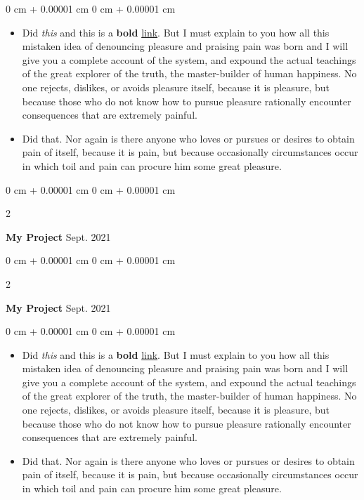 \documentclass[10pt, letterpaper]{article}
\newenvironment{highlights}{
    \begin{itemize}[
        topsep=0.10 cm,
        parsep=0.10 cm,
        partopsep=0pt,
        itemsep=0pt,
        leftmargin=0 cm + 10pt
    ]
}{
    \end{itemize}
} %
\newenvironment{onecolentry}{
    \begin{adjustwidth}{
        0 cm + 0.00001 cm
    }{
        0 cm + 0.00001 cm
    }
}{
    \end{adjustwidth}
} %
\newenvironment{twocolentry}[2][]{
    \onecolentry
    \def\secondColumn{#2}
    \setcolumnwidth{\fill, 4.5 cm}
    \begin{paracol}{2}
}{
    \switchcolumn \raggedleft \secondColumn
    \end{paracol}
    \endonecolentry
} %
\begin{document}
        \vspace{0.10 cm}
        \begin{onecolentry}
            \begin{highlights}
                \item Did \textit{this} and this is a \textbf{bold} \href{https://example.com}{link}. But I must explain to you how all this mistaken idea of denouncing pleasure and praising pain was born and I will give you a complete account of the system, and expound the actual teachings of the great explorer of the truth, the master-builder of human happiness. No one rejects, dislikes, or avoids pleasure itself, because it is pleasure, but because those who do not know how to pursue pleasure rationally encounter consequences that are extremely painful.
                \item Did that. Nor again is there anyone who loves or pursues or desires to obtain pain of itself, because it is pain, but because occasionally circumstances occur in which toil and pain can procure him some great pleasure.
            \end{highlights}
        \end{onecolentry}


        \vspace{0.2 cm}

        \begin{twocolentry}{
            Sept. 2021
        }
            \textbf{My Project}\end{twocolentry}



        \vspace{0.2 cm}

        \begin{twocolentry}{
            Sept. 2021
        }
            \textbf{My Project}\end{twocolentry}

        \vspace{0.10 cm}
        \begin{onecolentry}
            \begin{highlights}
                \item Did \textit{this} and this is a \textbf{bold} \href{https://example.com}{link}. But I must explain to you how all this mistaken idea of denouncing pleasure and praising pain was born and I will give you a complete account of the system, and expound the actual teachings of the great explorer of the truth, the master-builder of human happiness. No one rejects, dislikes, or avoids pleasure itself, because it is pleasure, but because those who do not know how to pursue pleasure rationally encounter consequences that are extremely painful.
                \item Did that. Nor again is there anyone who loves or pursues or desires to obtain pain of itself, because it is pain, but because occasionally circumstances occur in which toil and pain can procure him some great pleasure.
            \end{highlights}
        \end{onecolentry}
\end{document}
